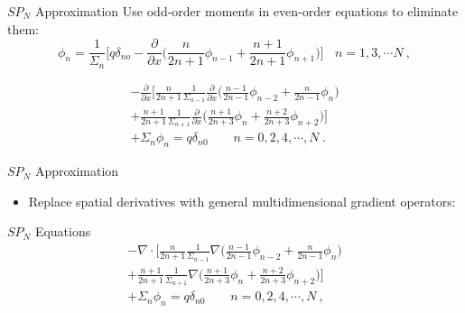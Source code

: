 \documentclass{beamer}
\begin{document}
\begin{frame}{$SP_N$ Approximation}
  Use odd-order moments in even-order equations to eliminate them:
  \begin{equation}
    \phi_n = \frac{1}{\Sigma_n}\Bigg[ q \delta_{no} -
      \frac{\partial}{\partial x}\Big(\frac{n}{2n+1}\phi_{n-1} +
      \frac{n+1}{2n+1} \phi_{n+1} \Big) \Bigg] \ \ \ \ n=1,3,\cdots N\:, 
    \label{eq:odd_moments}
  \end{equation}

  \begin{multline}
    -\frac{\partial}{\partial x}
    \Bigg[\frac{n}{2n+1}\frac{1}{\Sigma_{n-1}} \frac{\partial}{\partial
        x} \Big(\frac{n-1}{2n-1} \phi_{n-2} + \frac{n}{2n-1}\phi_n \Big)
      \\+ \frac{n+1}{2n+1}\frac{1}{\Sigma_{n+1}}
      \frac{\partial}{\partial x} \Big(\frac{n+1}{2n+3}\phi_n +
      \frac{n+2}{2n+3}\phi_{n+2}\Big) \Bigg] \\+ \Sigma_n \phi_n = q
    \delta_{n0}\ \ \ \ \ \ \ \ \ n = 0,2,4,\cdots,N\:.
    \label{eq:reduced_pn}
  \end{multline}

\end{frame}

\begin{frame}{$SP_N$ Approximation}

  \begin{itemize}
  \item Replace spatial derivatives with general multidimensional gradient
    operators:
  \end{itemize}

  \begin{beamerboxesrounded}[upper=boxheadcolor,lower=boxbodycolor,shadow=true]
    {$SP_N$ Equations}
    \begin{multline}
      -\nabla \cdot \Bigg[\frac{n}{2n+1}\frac{1}{\Sigma_{n-1}} \nabla
        \Big(\frac{n-1}{2n-1} \phi_{n-2} + \frac{n}{2n-1}\phi_n \Big)
        \\+ \frac{n+1}{2n+1}\frac{1}{\Sigma_{n+1}} \nabla
        \Big(\frac{n+1}{2n+3}\phi_n + \frac{n+2}{2n+3}\phi_{n+2}\Big)
        \Bigg] \\+ \Sigma_n \phi_n = q \delta_{n0}\ \ \ \ \ \ \ \ \ n
      = 0,2,4,\cdots,N\:,
      \label{eq:spn_equations}
    \end{multline}
  \end{beamerboxesrounded}

\end{frame}
\end{document}
